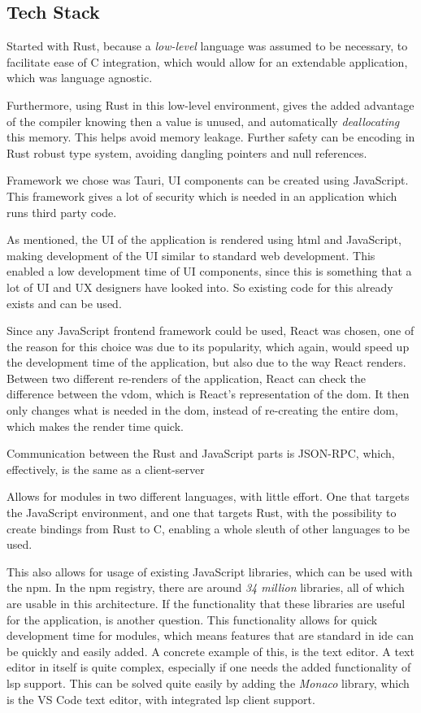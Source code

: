 \subsection{Tech Stack}

Started with Rust, because a \textit{low-level} language was assumed to be
necessary, to facilitate ease of C integration, which would allow for an
extendable application, which was language agnostic.

Furthermore, using Rust in this low-level environment, gives the added advantage
of the compiler knowing then a value is unused, and automatically
\textit{deallocating} this memory. This helps avoid memory leakage. Further
safety can be encoding in Rust robust type system, avoiding dangling pointers
and null references.

Framework we chose was Tauri, UI components can be created using JavaScript. This
framework gives a lot of security which is needed in an application which runs
third party code.

As mentioned, the UI of the application is rendered using \gls{html} and
JavaScript, making development of the UI similar to standard web development.
This enabled a low development time of UI components, since this is something
that a lot of UI and UX designers have looked into. So existing code for this
already exists and can be used.

Since any JavaScript frontend framework could be used, React was chosen, one of
the reason for this choice was due to its popularity, which again, would speed
up the development time of the application, but also due to the way React
renders. Between two different re-renders of the application, React can check
the difference between the \gls{vdom}, which is React's representation of the
\gls{dom}. It then only changes what is needed in the \gls{dom}, instead of
re-creating the entire \gls{dom}, which makes the render time quick.

Communication between the Rust and JavaScript parts is JSON-RPC, which,
effectively, is the same as a client-server

Allows for modules in two different languages, with little effort. One that
targets the JavaScript environment, and one that targets Rust, with the
possibility to create bindings from Rust to C, enabling a whole sleuth of other
languages to be used.

This also allows for usage of existing JavaScript libraries, which can be used
with the \gls{npm}. In the \gls{npm} registry, there are around
\textit{34 million} libraries, all of which are usable in this architecture. If
the functionality that these libraries are useful for the application, is
another question. This functionality allows for quick development time for
modules, which means features that are standard in \gls{ide} can be quickly and
easily added. A concrete example of this, is the text editor. A text editor in
itself is quite complex, especially if one needs the added functionality of
\gls{lsp} support. This can be solved quite easily by adding the \textit{Monaco}
library, which is the VS Code text editor, with integrated \gls{lsp} client
support.

